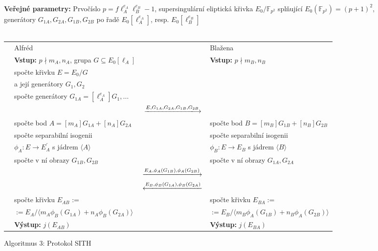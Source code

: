 \documentclass[12pt]{report}
\begin{document}
\begin{figure}[h]
\begin{center} 
\makebox[1cm]{\rule{17.3cm}{0.4pt}}\\
\hspace{-1.35cm} \textbf{Veřejné parametry:} Prvočíslo $p = f \ell_A ^{e_A} \ell_B ^{e_B} - 1$, supersingulární eliptická křivka $E_0/\mathbb{F}_{p^2}$ splňující $E_0(\mathbb{F}_{p^2}) = (p+1)^2$, generátory $G_{1A},G_{2A},G_{1B},G_{2B}$ po řadě $E_0[\ell_A ^{e_A}]$, resp. $E_0[\ell_B ^{e_B}]$\\

\vspace{-0.25cm}
\makebox[\linewidth]{\rule{17.3cm}{0.4pt}}\\
\vspace{0.2cm}
\hspace*{-1cm}\begin{tabular}{l l c l}
 \cline{2-2} \cline{4-4} 
& Alfréd & & Blažena \\ 
\cline{2-2} \cline{4-4} 
& \textbf{Vstup:} $p \nmid m_A,n_A$, grupa $G \subseteq E_0[\ell_A]$ & & \textbf{Vstup:} $p \nmid m_B,n_B$ \\
&spočte křivku $E = E_0/G$ & &\\
&a její generátory $G_1,G_2$ & &\\
&spočte generátory $G_{1A} = [\ell_A ^{e_A}] G_1,\dots$ & &\\
 & & $\xlongrightarrow{E,G_{1A},G_{2A},G_{1B},G_{2B}}$  &  \\
&spočte bod $A = [m_A]G_{1A}+[n_A]G_{2A}$ & & spočte bod $B = [m_B]G_{1B}+[n_B]G_{2B}$\\
&spočte separabilní isogenii& &spočte separabilní isogenii\\
&$\phi_A : E \longrightarrow E_A ^\prime$ s jádrem $\langle A\rangle$ & &$\phi_B : E \longrightarrow E_B$ s jádrem $\langle B\rangle$\\
&spočte v ní obrazy $G_{1B},G_{2B}$& &spočte  v ní obrazy $G_{1A},G_{2A}$\\
 & & $\xlongrightarrow{E_A, \phi_A (G_{1B}), \phi_A (G_{2B})}$  &  \\
&  & $\xlongleftarrow{E_B, \phi_B (G_{1A}), \phi_B (G_{2A})} $ &  \\
& spočte křivku $E_{AB}$ := & & spočte křivku $E_{BA} :=$\\
& $:= E_A/\langle m_A \phi_B (G_{1A})+ n_A \phi_B (G_{2A}) \rangle$ &  & $ := E_B/\langle m_B \phi_A (G_{1B})+ n_B \phi_A (G_{2B}) \rangle$ \\
& \textbf{Výstup:} $j(E_{AB})$ & & \textbf{Výstup:} $j(E_{BA})$
\end{tabular}
\caption*{Algoritmus 3: Protokol SITH}
\end{center}
\end{figure}
\end{document}

